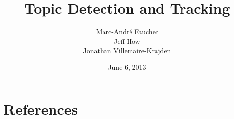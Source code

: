 \documentclass{article}
\title{Topic Detection and Tracking}
\author{
	Marc-André Faucher\\
	Jeff How\\
	Jonathan Villemaire-Krajden
}
\date{June 6, 2013}
\begin{document}
\maketitle
\section{References}
\nocite{*}


\end{document}
